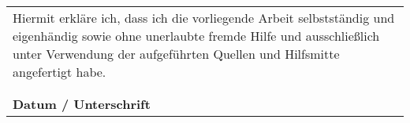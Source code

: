 \documentclass[11pt,a4paper,twoside]{book}
\begin{document}
\pagestyle{plain}




\clearpage
{\pagestyle{empty}\cleardoublepage}%



\begin{minipage}[b][12cm]{\textwidth}
	\begin{center}
		\begin{tabular}{m{12cm}}
			\large{Hiermit erkläre ich, dass ich die vorliegende Arbeit selbstständig und eigenhändig sowie ohne unerlaubte fremde Hilfe und ausschließlich unter Verwendung der aufgeführten Quellen und Hilfsmitte angefertigt habe. }				\\
											\\
											\\
			\midrule
			\textbf{Datum / Unterschrift}	\\
		\end{tabular}
	\end{center}
\end{minipage}

\cleardoublepage




\cleardoublepage




\setlength{\parskip}{3mm}
\setcounter{tocdepth}{5}
\tableofcontents
\cleardoublepage


\listoffigures
\vspace{1cm}

\begingroup
\let\clearpage\relax
\listoftables
\endgroup


\cleardoublepage



\pagestyle{headings}
\fancyhf{} 
\pagestyle{fancy} 
\fancyhead[LO]{\sc\nouppercase\rightmark} 
\fancyhead[RE]{\sc\nouppercase\leftmark}
\cfoot{\thepage}
\renewcommand{\headheight}{14pt}






\end{document}
